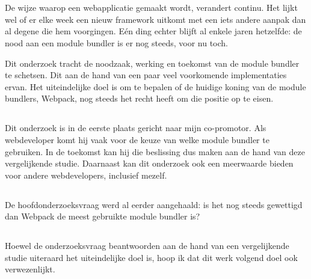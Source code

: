 \chapter{}
\label{ch:inleiding}

De wijze waarop een webapplicatie gemaakt wordt, verandert continu. Het lijkt wel of er elke week een nieuw framework uitkomt met een iets andere aanpak dan al degene die hem voorgingen. Eén ding echter blijft al enkele jaren hetzelfde: de nood aan een module bundler is er nog steeds, voor nu toch.

Dit onderzoek tracht de noodzaak, werking en toekomst van de module bundler te schetsen. Dit aan de hand van een paar veel voorkomende implementaties ervan. Het uiteindelijke doel is om te bepalen of de huidige koning van de module bundlers, Webpack, nog steeds het recht heeft om die positie op te eisen.

\section{}
\label{sec:probleemstelling}

Dit onderzoek is in de eerste plaats gericht naar mijn co-promotor. Als webdeveloper komt hij vaak voor de keuze van welke module bundler te gebruiken. In de toekomst kan hij die beslissing dus maken aan de hand van deze vergelijkende studie. Daarnaast kan dit onderzoek ook een meerwaarde bieden voor andere webdevelopers, inclusief mezelf.

\section{}
\label{sec:onderzoeksvraag}

De hoofdonderzoeksvraag werd al eerder aangehaald: is het nog steeds gewettigd dan Webpack de meest gebruikte module bundler is?

\section{}
\label{sec:onderzoeksdoelstelling}

Hoewel de onderzoeksvraag beantwoorden aan de hand van een vergelijkende studie uiteraard het uiteindelijke doel is, hoop ik dat dit werk volgend doel ook verwezenlijkt.

